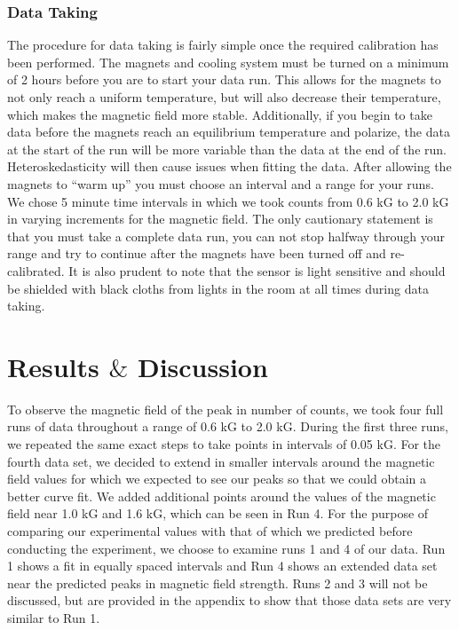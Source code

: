 \subsubsection{Data Taking}

The procedure for data taking is fairly simple once the required calibration has been performed.  The magnets and cooling system must be turned on a minimum of 2 hours before you are to start your data run.  This allows for the magnets to not only reach a uniform temperature, but will also decrease their temperature, which makes the magnetic field more stable. Additionally, if you begin to take data before the magnets reach an equilibrium temperature and polarize, the data at the start of the run will be more variable than the data at the end of the run. Heteroskedasticity will then cause issues when fitting the data. After allowing the magnets to ``warm up'' you must choose an interval and a range for your runs.  We chose 5 minute time intervals in which we took counts from 0.6 kG to 2.0 kG in varying increments for the magnetic field. The only cautionary statement is that you must take a complete data run, you can not stop halfway through your range and try to continue after the magnets have been turned off and re-calibrated. It is also prudent to note that the sensor is light sensitive and should be shielded with black cloths from lights in the room at all times during data taking. 

\section{Results $\&$ Discussion}
To observe the magnetic field of the peak in number of counts, we took four full runs of data throughout a range of 0.6 kG to 2.0 kG. During the first three runs, we repeated the same exact steps to take points in intervals of 0.05 kG. For the fourth data set, we decided to extend in smaller intervals around the magnetic field values for which we expected to see our peaks so that we could obtain a better curve fit. We added additional points around the values of the magnetic field near 1.0 kG and 1.6 kG, which can be seen in Run 4. For the purpose of comparing our experimental values with that of which we predicted before conducting the experiment, we choose to examine runs 1 and 4 of our data. Run 1 shows a fit in equally spaced intervals and Run 4 shows an extended data set near the predicted peaks in magnetic field strength. Runs 2 and 3 will not be discussed, but are provided in the appendix to show that those data sets are very similar to Run 1. \\

